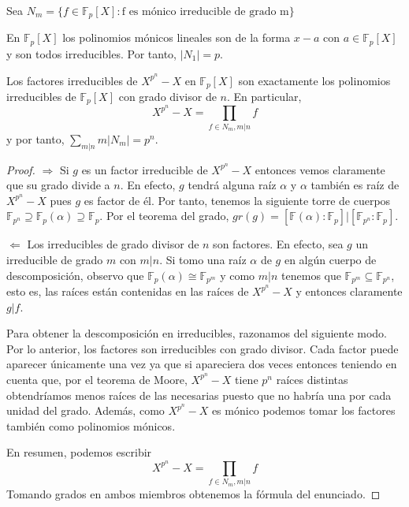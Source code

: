 Sea $N_m = \{f \in \mathbb{F}_p[X]:\text{f es mónico irreducible de grado m}\}$

\begin{example}[Cálculo de $|N_1|$]
En $\mathbb{F}_p[X]$ los polinomios mónicos lineales son de la forma $x-a$ con $a \in \mathbb{F}_p[X]$ y son todos irreducibles. Por tanto, $|N_1| = p$.	
\end{example}

\begin{theorem}
	Los factores irreducibles de $X^{p^n} - X$ en $\mathbb{F}_p[X]$ son exactamente los polinomios irreducibles de $\mathbb{F}_p[X]$ con grado divisor de $n$. En particular, $$X^{p^n} - X = \prod_{f \in N_m, m|n} f$$ y por tanto, $\sum_{m|n} m |N_m| = p^n$.
\end{theorem} 
\begin{proof}
$\Rightarrow$ Si $g$ es un factor irreducible de $X^{p^n} - X$ entonces vemos claramente que su grado divide a $n$. En efecto, $g$ tendrá alguna raíz $\alpha$ y $\alpha$ también es raíz de $X^{p^n} - X$ pues $g$ es factor de él. Por tanto, tenemos la siguiente torre de cuerpos $\mathbb{F}_{p^n} \supseteq \mathbb{F}_{p}(\alpha) \supseteq \mathbb{F}_p$. Por el teorema del grado, $gr(g) = [\mathbb{F}(\alpha):\mathbb{F}_p] | [\mathbb{F}_{p^n}:\mathbb{F}_p]$.
	
$\Leftarrow$ Los irreducibles de grado divisor de $n$ son factores. En efecto, sea $g$ un irreducible de grado $m$ con $m|n$. Si tomo una raíz $\alpha$ de $g$ en algún cuerpo de descomposición, observo que $\mathbb{F}_p(\alpha) \cong \mathbb{F}_{p^m}$ y como $m|n$ tenemos que $\mathbb{F}_{p^m} \subseteq \mathbb{F}_{p^n}$, esto es, las raíces están contenidas en las raíces de $X^{p^n} - X$ y entonces claramente $g|f$. 
	
Para obtener la descomposición en irreducibles, razonamos del siguiente modo. Por lo anterior, los factores son irreducibles con grado divisor. Cada factor puede aparecer únicamente una vez ya que si apareciera dos veces entonces teniendo en cuenta que, por el teorema de Moore, $X^{p^n}-X$ tiene $p^n$ raíces distintas obtendríamos menos raíces de las necesarias puesto que no habría una por cada unidad del grado. Además, como $X^{p^n}-X$ es mónico podemos tomar los factores también como polinomios mónicos. 
	
En resumen, podemos escribir $$X^{p^n} - X = \prod_{f \in N_m, m|n} f$$ Tomando grados en ambos miembros obtenemos la fórmula del enunciado. 
\end{proof}

